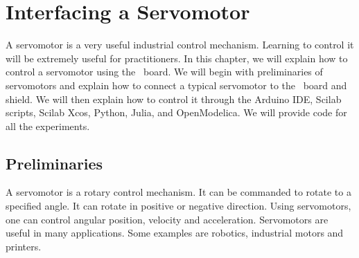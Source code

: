 \chapter {Interfacing a Servomotor}
\thispagestyle{empty}
\label{sec:servo}
\newcommand{\LocSERfig}{\Origin/user-code/servo/figures}
\newcommand{\LocSERscicode}{\Origin/user-code/servo/scilab}
\newcommand{\LocSERscibrief}[1]{{\tt \seqsplit{%
        Origin/user-code/servo/scilab/#1}},
  see \fnrefp{fn:file-loc}}

\newcommand{\LocSERardcode}{\Origin/user-code/servo/arduino}
\newcommand{\LocSERardbrief}[1]{{\tt \seqsplit{%
        Origin/user-code/servo/arduino/#1}},
  see \fnrefp{fn:file-loc}}

\newcommand{\LocSERpycode}{\Origin/user-code/servo/python}
\newcommand{\LocSERpybrief}[1]{{\tt \seqsplit{%
        Origin/user-code/servo/python/#1}},
  see \fnrefp{fn:file-loc}}

\newcommand{\LocSERjuliacode}{\Origin/user-code/servo/julia}
\newcommand{\LocSERjuliabrief}[1]{{\tt \seqsplit{%
        Origin/user-code/servo/julia/#1}},
  see \fnrefp{fn:file-loc}}

\newcommand{\LocSEROpenModelicacode}{\Origin/user-code/servo/OpenModelica}
\newcommand{\LocSEROpenModelicabrief}[1]{{\tt \seqsplit{%
        Origin/user-code/servo/OpenModelica/#1}},
  see \fnrefp{fn:file-loc}}

A servomotor is a very useful industrial control mechanism.  Learning
to control it will be extremely useful for practitioners.  In this
chapter, we will explain how to control a servomotor using the
\arduino\ board.  We will begin with preliminaries of servomotors and
explain how to connect a typical servomotor to the \arduino\ board and
shield.  We will then explain how to control it through the Arduino IDE,
Scilab scripts, Scilab Xcos, Python, Julia, and OpenModelica. 
We will provide code for all the experiments.

\section{Preliminaries}
\label{sec:servo-pril}
A servomotor is a rotary control mechanism.  It can be commanded to
rotate to a specified angle.  It can rotate in positive or negative
direction.  Using servomotors, one can control
angular position, velocity and acceleration.  Servomotors are useful
in many applications.  Some examples are robotics, industrial motors
and printers.

